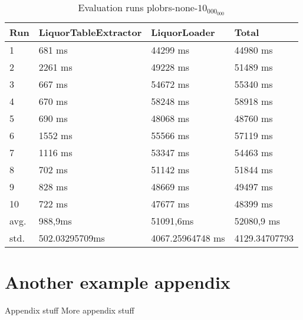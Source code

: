 \begin{table}[ht]
	\caption{Evaluation runs plobrs-none-$10_000_000$}
	\label{tab:eval:plobrs-none-10_000_000}
	\begin{tabular}{|l|l|l|l|}
		\hline
		Run  & LiquorTableExtractor & LiquorLoader     & Total         \\
		\hline
		1    & 681 ms               & 44299 ms         & 44980 ms      \\
		2    & 2261 ms              & 49228 ms         & 51489 ms      \\
		3    & 667 ms               & 54672 ms         & 55340 ms      \\
		4    & 670 ms               & 58248 ms         & 58918 ms      \\
		5    & 690 ms               & 48068 ms         & 48760 ms      \\
		6    & 1552 ms              & 55566 ms         & 57119 ms      \\
		7    & 1116 ms              & 53347 ms         & 54463 ms      \\
		8    & 702 ms               & 51142 ms         & 51844 ms      \\
		9    & 828 ms               & 48669 ms         & 49497 ms      \\
		10   & 722 ms               & 47677 ms         & 48399 ms      \\
		\hline
		avg. & 988,9ms              & 51091,6ms        & 52080,9 ms    \\
		std. & 502.03295709ms       & 4067.25964748 ms & 4129.34707793 \\
		\hline
	\end{tabular}
\end{table}






\pagebreak
\section{Another example appendix}
\label{appendix:example2}
\newpage
Appendix stuff
\newpage
More appendix stuff
